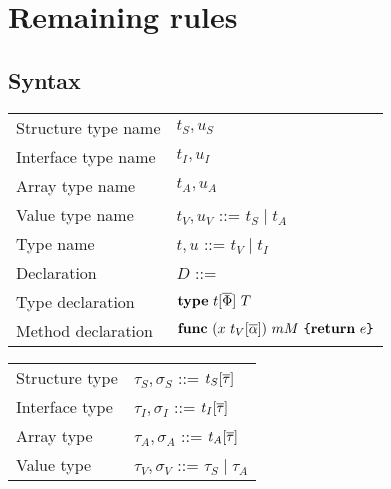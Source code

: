 \documentclass[12pt]{article}
\begin{document}



\section{Remaining rules}
\label{sec:remaining-rules}

\subsection{Syntax}

\begin{minipage}[t]{\textwidth}
    \begin{tabular}[t]{ll}
        Structure type name      & $t_S, u_S$                                           \\
        Interface type name      & $t_I, u_I$                                           \\
        Array type name          & $t_A, u_A$                                           \\
        Value type name          & $t_V, u_V$ ::= $t_S \mid t_A$                        \\
        Type name                & $t, u$ ::= $t_V \mid t_I$                            \\
        Declaration              & $D$ ::=                                              \\
        \quad Type declaration   & \quad $\texttt{\bf type}~t[\overline{\Phi}]~T$                         \\
        \quad Method declaration & \quad $\texttt{\bf func}~(x~t_V[\overline{\alpha}])~mM~\texttt{\{}\texttt{\bf return}~e\texttt{\}}$ \\
    \end{tabular}
\end{minipage}
\hspace{-0.5\textwidth}
\begin{minipage}[t]{0.4\textwidth}
    \begin{tabular}[t]{ll}
        Structure type & $\tau_S, \sigma_S$ ::= $t_S[\overline{\tau}]$     \\
        Interface type & $\tau_I, \sigma_I$ ::= $t_I[\overline{\tau}]$     \\
        Array type     & $\tau_A, \sigma_A$ ::= $t_A[\overline{\tau}]$     \\
        Value type     & $\tau_V, \sigma_V$ ::= $\tau_S \mid \tau_A$ \\
    \end{tabular}
\end{minipage}
\end{document}

